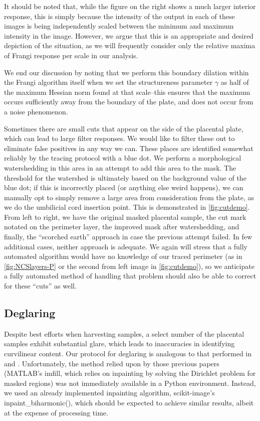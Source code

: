     It should be noted that, while the figure on the right shows a much larger interior response, this is simply because the intensity of the output in each of these
    images is being independently scaled between the minimum and maximum intensity in the image. However, we argue that this is an appropriate and desired depiction of the situation, as we will frequently consider only the relative maxima of Frangi response per scale in our analysis.
    
    We end our discussion by noting that we perform this boundary dilation within the
    Frangi algorithm itself when we set the structureness parameter $\gamma$ as half of the maximum Hessian norm found at that scale--this ensures that the maximum occurs sufficiently away from the boundary of the plate, and does not occur from a noise phenomenon.

    
    
    Sometimes there are small cuts that appear on the side of the placental plate, which can lead to large filter responses. We would like to filter these out to eliminate false positives in any way we can. These places are identified somewhat reliably by the tracing protocol with a blue dot. We perform a morphological watershedding in this area in an attempt to add this area to the mask.
    The threshold for the watershed is ultimately based on the background value of the blue dot; if this is incorrectly placed (or anything else weird happens), we can manually opt to simply remove a large area from consideration from the plate, as we do the umbilicial cord insertion point. This is demonstrated in \cref{fig:cutdemo}. From left to right, we have the original masked placental sample, the cut mark notated on the perimeter layer, the improved mask after watershedding, and finally, the ``scorched earth'' approach in case the previous attempt failed. In few additional cases, neither approach is adequate. We again will stress that a fully automated algorithm would have no knowledge of our traced perimeter (as in \cref{fig:NCSlayers-P} or the second from left image in \cref{fig:cutdemo}), so we anticipate a fully automated method of handling that problem should also be able to correct for these ``cuts'' as well.

		
		    \subsection{Deglaring}
    
    Despite best efforts when harvesting samples, a select number of the placental samples exhibit substantial glare, which leads to inaccuracies in identifying curvilinear content. Our protocol for deglaring is analogous to that performed in \autocite{almoussa-ucla-reu} and \autocite{huynh2013filter}. Unfortunately, the method relied upon by those previous papers (\textrm{MATLAB}'s \textrm{imfill}, which relies on inpainting by solving the Dirichlet problem for masked regions) was not immediately available in a Python environment. Instead, we used an already implemented inpainting algorithm, \textrm{scikit-image}'s \textrm{inpaint\_biharmonic()}, which should be expected to achieve similar results, albeit at the expense of processing time.
    

